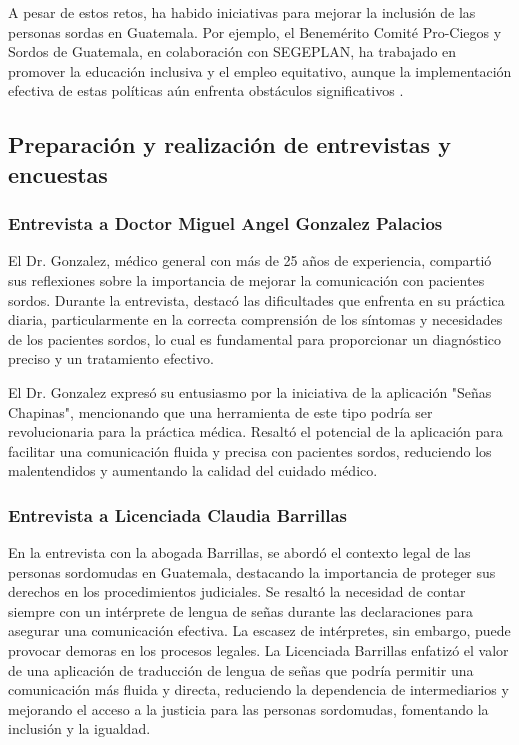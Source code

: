 A pesar de estos retos, ha habido iniciativas para mejorar la inclusión de las personas sordas en Guatemala. Por ejemplo, el Benemérito Comité Pro-Ciegos y Sordos de Guatemala, en colaboración con SEGEPLAN, ha trabajado en promover la educación inclusiva y el empleo equitativo, aunque la implementación efectiva de estas políticas aún enfrenta obstáculos significativos \cite{GobiernoGuatemala2022}.


\subsection{Preparación y realización de entrevistas y encuestas}

\subsubsection{Entrevista a Doctor Miguel Angel Gonzalez Palacios}

El Dr. Gonzalez, médico general con más de 25 años de experiencia, compartió sus reflexiones sobre la importancia de mejorar la comunicación con pacientes sordos. Durante la entrevista, destacó las dificultades que enfrenta en su práctica diaria, particularmente en la correcta comprensión de los síntomas y necesidades de los pacientes sordos, lo cual es fundamental para proporcionar un diagnóstico preciso y un tratamiento efectivo.

El Dr. Gonzalez expresó su entusiasmo por la iniciativa de la aplicación "Señas Chapinas", mencionando que una herramienta de este tipo podría ser revolucionaria para la práctica médica. Resaltó el potencial de la aplicación para facilitar una comunicación fluida y precisa con pacientes sordos, reduciendo los malentendidos y aumentando la calidad del cuidado médico. 

\subsubsection{Entrevista a Licenciada Claudia Barrillas}

En la entrevista con la abogada Barrillas, se abordó el contexto legal de las personas sordomudas en Guatemala, destacando la importancia de proteger sus derechos en los procedimientos judiciales. Se resaltó la necesidad de contar siempre con un intérprete de lengua de señas durante las declaraciones para asegurar una comunicación efectiva. La escasez de intérpretes, sin embargo, puede provocar demoras en los procesos legales. La Licenciada Barrillas enfatizó el valor de una aplicación de traducción de lengua de señas que podría permitir una comunicación más fluida y directa, reduciendo la dependencia de intermediarios y mejorando el acceso a la justicia para las personas sordomudas, fomentando la inclusión y la igualdad.

